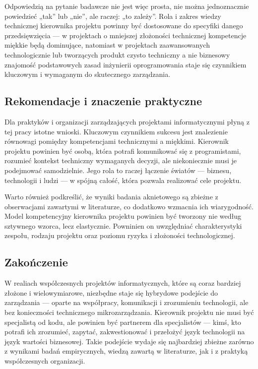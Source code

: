 Odpowiedzią na pytanie badawcze nie jest więc prosta, nie można jednoznacznie powiedzieć „tak” lub „nie”, ale raczej: „to zależy”. Rola i zakres wiedzy technicznej kierownika projektu powinny być dostosowane do specyfiki danego przedsięwzięcia — w projektach o mniejszej złożoności technicznej kompetencje miękkie będą dominujące, natomiast w projektach zaawansowanych technologicznie lub tworzących produkt czysto techniczny a nie biznesowy znajomość podstawowych zasad inżynierii oprogramowania staje się czynnikiem kluczowym i wymaganym do skutecznego zarządzania.

\subsection{Rekomendacje i znaczenie praktyczne}

Dla praktyków i organizacji zarządzających projektami informatycznymi płyną z tej pracy istotne wnioski. Kluczowym czynnikiem sukcesu jest znalezienie równowagi pomiędzy kompetencjami technicznymi a miękkimi. Kierownik projektu powinien być osobą, która potrafi komunikować się z programistami, rozumieć kontekst techniczny wymaganych decyzji, ale niekoniecznie musi je podejmować samodzielnie. Jego rola to raczej łączenie światów — biznesu, technologii i ludzi — w spójną całość, która pozwala realizować cele projektu.

Warto również podkreślić, że wyniki badania aknietowego są zbieżne z obserwacjami zawartymi w literaturze, co dodatkowo wzmacnia ich wiarygodność. Model kompetencyjny kierownika projektu powinien być tworzony nie według sztywnego wzorca, lecz elastycznie. Powninien on uwzględniać charakterystyki zespołu, rodzaju projektu oraz poziomu ryzyka i złożoności technologicznej.

\subsection{Zakończenie}

W realiach współczesnych projektów informatycznych, które są coraz bardziej złożone i wielowymiarowe, niezbędne staje się hybrydowe podejście do zarządzania — oparte na współpracy, komunikacji i zrozumieniu technologii, ale bez konieczności technicznego mikrozarządzania. Kierownik projektu nie musi być specjalistą od kodu, ale powinien być partnerem dla specjalistów — kimś, kto potrafi ich zrozumieć, zapytać, zakwestionować i przełożyć język technologii na język wartości biznesowej. Takie podejście wydaje się najbardziej zbieżne zarówno z wynikami badań empirycznych, wiedzą zawartą w literaturze, jak i z praktyką współczesnych organizacji.
